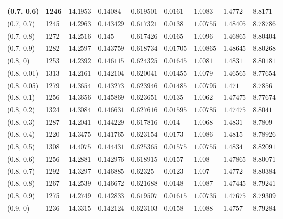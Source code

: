 \begin{center}
{\begin{longtable}{| l | p{} |  p{} | p{} | p{} | p{} | p{} | p{} | p{} |}
 (0.7, 0.6) & 1246  & $14.1953$ & $0.14084$ & $0.619501$ & $0.0161$ & $1.0083$ & $1.4772$ & $8.8171$ \\ \hline
 (0.7, 0.7) & 1245  & $14.2963$ & $0.143429$ & $0.617321$ & $0.0138$ & $1.00755$ & $1.48405$ & $8.78786$ \\ \hline
 (0.7, 0.8) & 1272  & $14.2516$ & $0.145$ & $0.617426$ & $0.0165$ & $1.0096$ & $1.46865$ & $8.80404$ \\ \hline
 (0.7, 0.9) & 1282  & $14.2597$ & $0.143759$ & $0.618734$ & $0.01705$ & $1.00865$ & $1.48645$ & $8.80268$ \\ \hline
 (0.8, 0) & 1253  & $14.2392$ & $0.146115$ & $0.624325$ & $0.01645$ & $1.0081$ & $1.4831$ & $8.80181$ \\ \hline
 (0.8, 0.01) & 1313  & $14.2161$ & $0.142104$ & $0.620041$ & $0.01455$ & $1.0079$ & $1.46565$ & $8.77654$ \\ \hline
 (0.8, 0.05) & 1279  & $14.3654$ & $0.143273$ & $0.623946$ & $0.01485$ & $1.00795$ & $1.471$ & $8.7856$ \\ \hline
 (0.8, 0.1) & 1256  & $14.3656$ & $0.145869$ & $0.623651$ & $0.0135$ & $1.0062$ & $1.47475$ & $8.77674$ \\ \hline
 (0.8, 0.2) & 1324  & $14.3084$ & $0.146631$ & $0.627616$ & $0.01595$ & $1.00785$ & $1.47475$ & $8.8041$ \\ \hline
 (0.8, 0.3) & 1287  & $14.2041$ & $0.144229$ & $0.617816$ & $0.014$ & $1.0068$ & $1.4831$ & $8.7809$ \\ \hline
 (0.8, 0.4) & 1220  & $14.3475$ & $0.141765$ & $0.623154$ & $0.0173$ & $1.0086$ & $1.4815$ & $8.78926$ \\ \hline
 (0.8, 0.5) & 1308  & $14.4075$ & $0.144431$ & $0.625365$ & $0.01575$ & $1.00755$ & $1.4834$ & $8.82091$ \\ \hline
 (0.8, 0.6) & 1256  & $14.2881$ & $0.142976$ & $0.618915$ & $0.0157$ & $1.008$ & $1.47865$ & $8.80071$ \\ \hline
 (0.8, 0.7) & 1292  & $14.3297$ & $0.146885$ & $0.62325$ & $0.0123$ & $1.007$ & $1.4772$ & $8.80384$ \\ \hline
 (0.8, 0.8) & 1267  & $14.2539$ & $0.146672$ & $0.621688$ & $0.0148$ & $1.0087$ & $1.47445$ & $8.79241$ \\ \hline
 (0.8, 0.9) & 1275  & $14.2749$ & $0.142833$ & $0.619507$ & $0.01615$ & $1.00735$ & $1.47675$ & $8.79309$ \\ \hline
 (0.9, 0) & 1236  & $14.3315$ & $0.142124$ & $0.623103$ & $0.0158$ & $1.0088$ & $1.4757$ & $8.79284$ \\ \hline

\end{longtable}}
\end{center}
